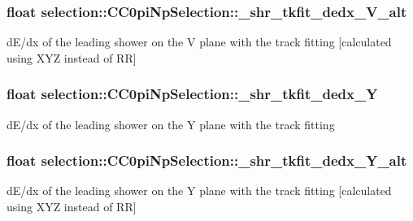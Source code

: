 \subsubsection[{\texorpdfstring{\+\_\+shr\+\_\+tkfit\+\_\+dedx\+\_\+\+V\+\_\+alt}{_shr_tkfit_dedx_V_alt}}]{\setlength{\rightskip}{0pt plus 5cm}float selection\+::\+C\+C0pi\+Np\+Selection\+::\+\_\+shr\+\_\+tkfit\+\_\+dedx\+\_\+\+V\+\_\+alt\hspace{0.3cm}{\ttfamily [private]}}\hypertarget{classselection_1_1CC0piNpSelection_aee315f8b5aefc0716f228901b1816939}{}\label{classselection_1_1CC0piNpSelection_aee315f8b5aefc0716f228901b1816939}
d\+E/dx of the leading shower on the V plane with the track fitting \mbox{[}calculated using X\+YZ instead of RR\mbox{]} 
\subsubsection[{\texorpdfstring{\+\_\+shr\+\_\+tkfit\+\_\+dedx\+\_\+Y}{_shr_tkfit_dedx_Y}}]{\setlength{\rightskip}{0pt plus 5cm}float selection\+::\+C\+C0pi\+Np\+Selection\+::\+\_\+shr\+\_\+tkfit\+\_\+dedx\+\_\+Y\hspace{0.3cm}{\ttfamily [private]}}\hypertarget{classselection_1_1CC0piNpSelection_ababbbc32babdef645c2edc613713ceb7}{}\label{classselection_1_1CC0piNpSelection_ababbbc32babdef645c2edc613713ceb7}
d\+E/dx of the leading shower on the Y plane with the track fitting 
\subsubsection[{\texorpdfstring{\+\_\+shr\+\_\+tkfit\+\_\+dedx\+\_\+\+Y\+\_\+alt}{_shr_tkfit_dedx_Y_alt}}]{\setlength{\rightskip}{0pt plus 5cm}float selection\+::\+C\+C0pi\+Np\+Selection\+::\+\_\+shr\+\_\+tkfit\+\_\+dedx\+\_\+\+Y\+\_\+alt\hspace{0.3cm}{\ttfamily [private]}}\hypertarget{classselection_1_1CC0piNpSelection_a581a6115360136c7364f421b9f1ca4fe}{}\label{classselection_1_1CC0piNpSelection_a581a6115360136c7364f421b9f1ca4fe}
d\+E/dx of the leading shower on the Y plane with the track fitting \mbox{[}calculated using X\+YZ instead of RR\mbox{]} 
